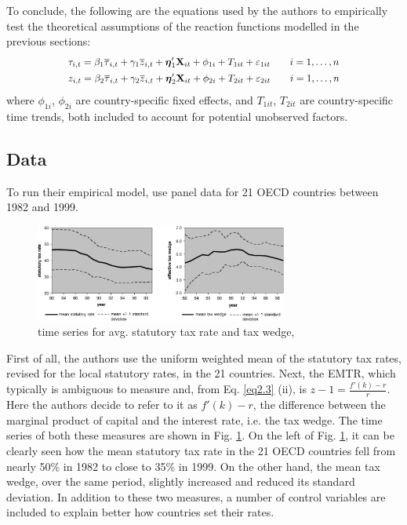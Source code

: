 To conclude, the following are the equations used by the authors to empirically test the theoretical assumptions of the reaction functions modelled in the previous sections:
\vspace{-5pt}
\begin{align}
&\label{eq2.9} \scalemath{0.9}
{\tau_{i,t}=\beta_1\overline{\tau}_{i,t}+\gamma_1\overline{z}_{i,t}+\boldsymbol{\eta}_{1}'\textbf{X}_{it}+\phi_{1i}+T_{1it}+\varepsilon_{1it} \quad \quad i=1,\dots,n}\\
&\label{eq2.10} \scalemath{0.9}{z_{i,t}=\beta_2\overline{\tau}_{i,t}+\gamma_2\overline{z}_{i,t}+\boldsymbol{\eta}_{2}'\textbf{X}_{it}+\phi_{2i}+T_{2it}+\varepsilon_{2it} \quad \quad i=1,\dots,n}
\vspace{-5pt}
\end{align}
where $\phi_{1i}$, $\phi_{2i}$ are country-specific fixed effects, and $T_{1it}$, $T_{2it}$ are country-specific time trends, both included to account for potential unobserved factors.
\vspace{-7pt}
\subsection{Data}\label{dev-data}

To run their empirical model, \textcite{dev-loc-red-08} use panel data for 21 OECD countries between 1982 and 1999.

\begin{figure}[h]
    \centering
    \captionsetup{font=footnotesize}\caption{time series for avg. statutory tax rate and tax wedge, \textcite{dev-loc-red-08}}
    \label{dev-rate-fall}
    \includegraphics[width=0.74\textwidth]{img/devereux-rates.jpg}
    \vspace{-5pt}
\end{figure}
First of all, the authors use the uniform weighted mean of the statutory tax rates, revised for the local statutory rates, in the 21 countries. Next, the EMTR, which typically is ambiguous to measure and, from Eq. \ref{eq2.3} (ii), is $z-1= \frac{f'(k)-r}{r}$. Here the authors decide to refer to it as $f'(k)-r$, the difference between the marginal product of capital and the interest rate, i.e. the tax wedge. The time series of both these measures are shown in Fig. \ref{dev-rate-fall}. On the left of Fig. \ref{dev-rate-fall}, it can be clearly seen how the mean statutory tax rate in the 21 OECD countries fell from nearly 50\% in 1982 to close to 35\% in 1999. On the other hand, the mean tax wedge, over the same period, slightly increased and reduced its standard deviation. In addition to these two measures, a number of control variables are included to explain better how countries set their rates.

